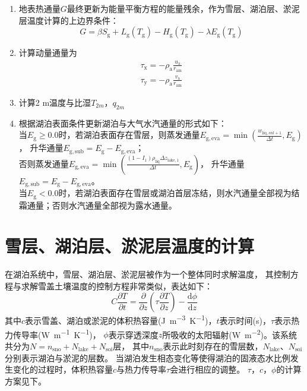 \begin{enumerate}
  \item 地表热通量$G$最终更新为能量平衡方程的能量残余，作为雪层、湖泊层、淤泥层温度计算的上边界条件：
    \begin{equation}
      G=\beta S_{\mathrm{g}}+L_{\mathrm{g}}\left(T_{\mathrm{g}}\right)-H_{\mathrm{g}}\left(T_{\mathrm{g}}\right)-\lambda E_{\mathrm{g}}\left(T_{\mathrm{g}}\right)
    \end{equation}
  \item 计算动量通量为
    \begin{equation}
      \begin{array}{c}\tau_{\mathrm{x}}=-\rho_{\mathrm{a}} \frac{u_{\mathrm{a}}}{r_{\mathrm{am}}} \\ \tau_{\mathrm{y}}=-\rho_{\mathrm{a}} \frac{v_{\mathrm{a}}}{r_{\mathrm{am}}}\end{array}
    \end{equation}
  \item 计算2 m温度与比湿$T_{2m}$，$q_{2m}$
  \item 根据湖泊表面条件更新湖泊与大气水汽通量的形式如下：\\
    当$E_{\mathrm {g}} \geqslant 0.0$时，若湖泊表面存在雪层，则蒸发通量$E_{\mathrm{g,eva}}=\min \left(\frac{w_{\mathrm{liq},snl+1}}{\Delta t}, E_{\mathrm{g}}\right)$，
    升华通量$E_{\mathrm{g,sub}}=E_{\mathrm{g}}-E_{\mathrm{g,eva}}$；\\
    否则蒸发通量$E_{\mathrm{g,eva}}=\min \left(\frac{\left(1-I_{1}\right) \rho_{\mathrm{liq}} \Delta z_{\mathrm{lake, 1}}}{\Delta t}, E_{\mathrm{g}}\right)$，
    升华通量$E_{\mathrm{g,sub}}=E_{\mathrm{g}}-E_{\mathrm{g,eva}}$。\\
    当$E_{\mathrm {g}} <0.0$时，若湖泊表面存在雪层或湖泊首层冻结，则水汽通量全部视为结霜通量；否则水汽通量全部视为露水通量。

\end{enumerate}

\section{雪层、湖泊层、淤泥层温度的计算}\label{雪层湖泊层淤泥层温度的计算}
在湖泊系统中，雪层、湖泊层、淤泥层被作为一个整体同时求解温度，
其控制方程与求解雪盖土壤温度的控制方程非常类似，表达如下：
\begin{equation}
  C \frac{\partial T}{\partial t}=\frac{\partial}{\partial z}\left(\tau \frac{\partial T}{\partial z}\right)-\frac{{\mathrm d} \phi}{{\mathrm {d}} z}
\end{equation}
其中$c$表示雪盖、湖泊或淤泥的体积热容量(\unit{J.m^{-3}.K^{-1}})，$t$表示时间(s)，$\tau$表示热力传导率(\unit{W.m^{-1}.K^{-1}})，
$\phi$表示穿透深度$z$所吸收的太阳辐射(\unit{W.m^{-2}})。该系统共分为$N=n_{\mathrm{sno}}+N_{\mathrm{lake}}+N_{\mathrm{soi}}$层，
其中$n_{\mathrm{sno}}$表示此时刻存在的雪层数，$N_{\mathrm{lake}}$、$N_{\mathrm{soi}}$分别表示湖泊与淤泥的层数。
当湖泊发生相态变化等使得湖泊的固液态水比例发生变化的过程时，体积热容量$c$与热力传导率$\tau$会进行相应的调整。
$\tau$，$c$，$\phi$的计算方案见下。


